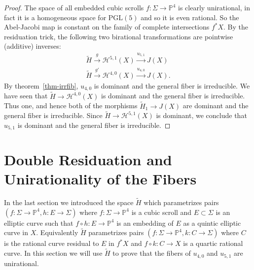\documentclass[amssymb,twoside,12 pt,amscd,reqno]{amsart}
\theoremstyle{plain}
\theoremstyle{definition}
\newcommand{\Hdg}[2]{\mathcal{H}^{#1,#2}}
\newcommand{\PP}{\mathbb{P}}
\def\ps{\vspace{4pt}}
\begin{document}
\begin{proof}
The space of all embedded cubic scrolls $f:\Sigma \rightarrow
\PP^4$ is clearly unirational, 
in fact it is a homogeneous space for $\text{PGL}(5)$ and so it is even
rational.  So the Abel-Jacobi map is constant on the family of
complete intersections $f^*X$.  
By the residuation trick, the following two birational transformations
are pointwise (additive) inverses:
\begin{eqnarray}
\widetilde{H}\xrightarrow{g} \Hdg{5}{1}(X) \xrightarrow{u_{5,1}} J(X) \\
\widetilde{H}\xrightarrow{g'} \Hdg{4}{0}(X) \xrightarrow{u_{4,0}}
J(X). \nonumber
\end{eqnarray}
By theorem~\ref{thm-irrfib}, $u_{4,0}$ is dominant and the general
fiber is irreducible.  We have seen that $\widetilde{H}\rightarrow
\Hdg{4}{0}(X)$ is dominant and the general fiber is irreducible.  Thus
one, and hence both 
of the morphisms $\widetilde{H}_1\rightarrow J(X)$ are dominant and the
general fiber is irreducible.  Since $\widetilde{H}\rightarrow
\Hdg{5}{1}(X)$ is dominant, we conclude that $u_{5,1}$ is dominant and
the general fiber is irreducible.  
\end{proof}

\section{Double Residuation and Unirationality of the Fibers}

In the last section we introduced the space $\widetilde{H}$ which
parametrizes pairs $(f:\Sigma\rightarrow \PP^4,
h:E\rightarrow \Sigma)$ where $f:\Sigma\rightarrow \PP^4$ is a cubic
scroll and $E\subset \Sigma$ is an elliptic curve such that $f\circ
h:E\rightarrow \PP^4$ is an embedding of $E$ as a quintic elliptic
curve in $X$.  Equivalently $\widetilde{H}$ parametrizes pairs
$(f:\Sigma\rightarrow \PP^4, k:C\rightarrow \Sigma)$ where $C$ is the
rational curve residual to $E$ in $f^*X$ and $f\circ k:C\rightarrow X$
is a quartic rational curve.  In this section we will use
$\widetilde{H}$ to prove that the fibers of $u_{4,0}$ and $u_{5,1}$
are unirational.

\ps
\end{document}
